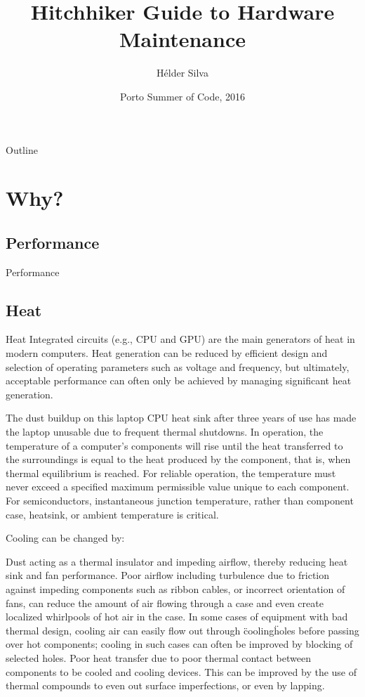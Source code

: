 \documentclass{beamer}
\title{Hitchhiker Guide to Hardware Maintenance}
\author{Hélder Silva}
\date{Porto Summer of Code, 2016}
\begin{document}
\begin{frame}
  \titlepage
\end{frame}

\begin{frame}{Outline}
  \tableofcontents
\end{frame}

\section{Why?}

\subsection{Performance}

\begin{frame}{Performance}
\end{frame}

\subsection{Heat}

\begin{frame}{Heat}
Integrated circuits (e.g., CPU and GPU) are the main generators of heat in modern computers. Heat generation can be reduced by efficient design and selection of operating parameters such as voltage and frequency, but ultimately, acceptable performance can often only be achieved by managing significant heat generation.

The dust buildup on this laptop CPU heat sink after three years of use has made the laptop unusable due to frequent thermal shutdowns.
In operation, the temperature of a computer's components will rise until the heat transferred to the surroundings is equal to the heat produced by the component, that is, when thermal equilibrium is reached. For reliable operation, the temperature must never exceed a specified maximum permissible value unique to each component. For semiconductors, instantaneous junction temperature, rather than component case, heatsink, or ambient temperature is critical.

Cooling can be changed by:

Dust acting as a thermal insulator and impeding airflow, thereby reducing heat sink and fan performance.
Poor airflow including turbulence due to friction against impeding components such as ribbon cables, or incorrect orientation of fans, can reduce the amount of air flowing through a case and even create localized whirlpools of hot air in the case. In some cases of equipment with bad thermal design, cooling air can easily flow out through \"cooling\" holes before passing over hot components; cooling in such cases can often be improved by blocking of selected holes.
Poor heat transfer due to poor thermal contact between components to be cooled and cooling devices. This can be improved by the use of thermal compounds to even out surface imperfections, or even by lapping.
\end{frame}
\end{document}

